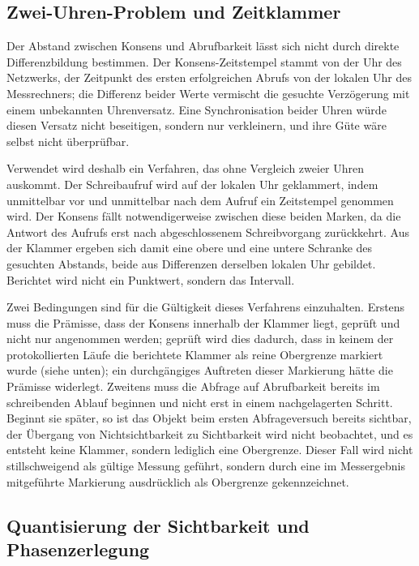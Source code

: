 \subsection{Zwei-Uhren-Problem und Zeitklammer}
\label{subsec:impl-zeitklammer}

Der Abstand zwischen Konsens und Abrufbarkeit lässt sich nicht durch direkte Differenzbildung bestimmen. Der Konsens-Zeitstempel stammt von der Uhr des Netzwerks, der Zeitpunkt des ersten erfolgreichen Abrufs von der lokalen Uhr des Messrechners; die Differenz beider Werte vermischt die gesuchte Verzögerung mit einem unbekannten Uhrenversatz. Eine Synchronisation beider Uhren würde diesen Versatz nicht beseitigen, sondern nur verkleinern, und ihre Güte wäre selbst nicht überprüfbar.

Verwendet wird deshalb ein Verfahren, das ohne Vergleich zweier Uhren auskommt. Der Schreibaufruf wird auf der lokalen Uhr geklammert, indem unmittelbar vor und unmittelbar nach dem Aufruf ein Zeitstempel genommen wird. Der Konsens fällt notwendigerweise zwischen diese beiden Marken, da die Antwort des Aufrufs erst nach abgeschlossenem Schreibvorgang zurückkehrt. Aus der Klammer ergeben sich damit eine obere und eine untere Schranke des gesuchten Abstands, beide aus Differenzen derselben lokalen Uhr gebildet. Berichtet wird nicht ein Punktwert, sondern das Intervall.

Zwei Bedingungen sind für die Gültigkeit dieses Verfahrens einzuhalten. Erstens muss die Prämisse, dass der Konsens innerhalb der Klammer liegt, geprüft und nicht nur angenommen werden; geprüft wird dies dadurch, dass in keinem der protokollierten Läufe die berichtete Klammer als reine Obergrenze markiert wurde (siehe unten); ein durchgängiges Auftreten dieser Markierung hätte die Prämisse widerlegt. Zweitens muss die Abfrage auf Abrufbarkeit bereits im schreibenden Ablauf beginnen und nicht erst in einem nachgelagerten Schritt. Beginnt sie später, so ist das Objekt beim ersten Abfrageversuch bereits sichtbar, der Übergang von Nichtsichtbarkeit zu Sichtbarkeit wird nicht beobachtet, und es entsteht keine Klammer, sondern lediglich eine Obergrenze. Dieser Fall wird nicht stillschweigend als gültige Messung geführt, sondern durch eine im Messergebnis mitgeführte Markierung ausdrücklich als Obergrenze gekennzeichnet.

\subsection{Quantisierung der Sichtbarkeit und Phasenzerlegung}
\label{subsec:impl-phasenzerlegung}

